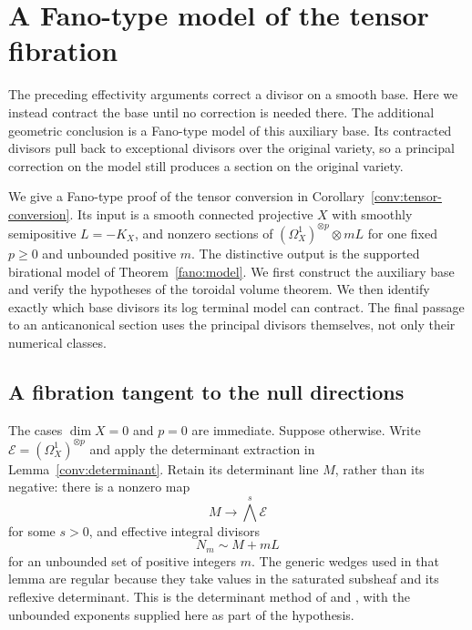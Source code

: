 \section{A Fano-type model of the tensor fibration}
\label{fano:section}

The preceding effectivity arguments correct a divisor on a smooth base.
Here we instead contract the base until no correction is needed there.
The additional geometric conclusion is a Fano-type model of this
auxiliary base.  Its contracted divisors pull back to exceptional
divisors over the original variety, so a principal correction on the
model still produces a section on the original variety.

We give a Fano-type proof of the tensor conversion in
Corollary~\ref{conv:tensor-conversion}.  Its input is a smooth
connected projective $X$ with smoothly semipositive $L=-K_X$, and
nonzero sections of $(\Omega_X^1)^{\otimes p}\otimes mL$ for one
fixed $p\geq0$ and unbounded positive $m$.  The distinctive output
is the supported birational model of Theorem~\ref{fano:model}.
We first construct the auxiliary base and verify the hypotheses of
the toroidal volume theorem.  We then identify exactly which base
divisors its log terminal model can contract.  The final passage to
an anticanonical section uses the principal divisors themselves,
not only their numerical classes.

\subsection{A fibration tangent to the null directions}

The cases $\dim X=0$ and $p=0$ are immediate.  Suppose otherwise.
Write $\mathcal E=(\Omega_X^1)^{\otimes p}$ and apply the
determinant extraction in Lemma~\ref{conv:determinant}.
Retain its determinant line $M$, rather than its negative: there is a nonzero map
\[
 M\longrightarrow\bigwedge^s\mathcal E
\]
for some $s>0$, and effective integral divisors
\begin{equation}\label{fano:determinants}
 N_m\sim M+mL
\end{equation}
for an unbounded set of positive integers $m$.  The generic wedges
used in that lemma are regular because they take values in the
saturated subsheaf and its reflexive determinant.  This is the
determinant method of \cite[Lemma~4.1]{LP2018} and
\cite[Lemma~5.1]{LMPTX2023}, with the unbounded exponents supplied
here as part of the hypothesis.


